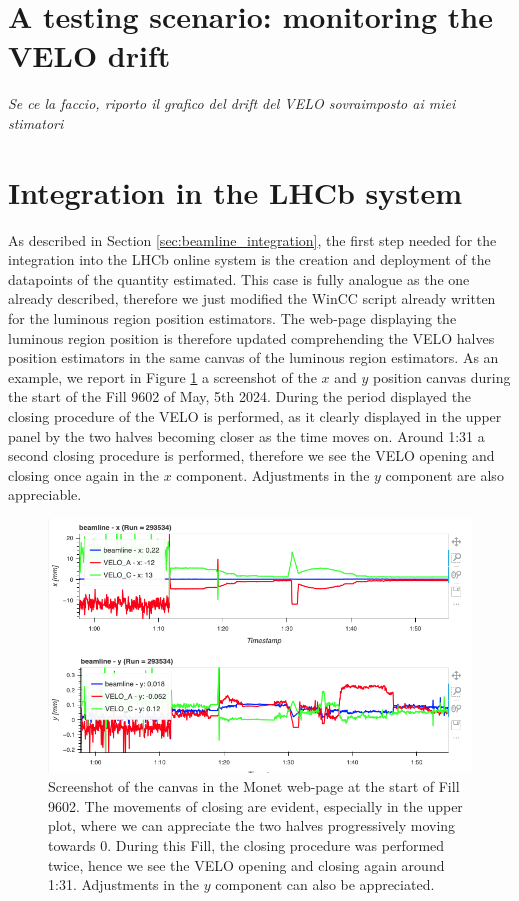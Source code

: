 \section{A testing scenario: monitoring the VELO drift}
\textit{Se ce la faccio, riporto il grafico del drift del VELO sovraimposto ai miei stimatori}

\section{Integration in the LHCb system}\label{sec:integration_detector}
As described in Section \ref{sec:beamline_integration}, the first step needed for the integration into the LHCb online system is the creation and deployment of the datapoints of the quantity estimated. This case is fully analogue as the one already described, therefore we just modified the WinCC script already written for the luminous region position estimators. The web-page displaying the luminous region position is therefore updated comprehending the VELO halves position estimators in the same canvas of the luminous region estimators. As an example, we report in Figure \ref{fig:VELO_closing_xy} a screenshot of the $x$ and $y$ position canvas during the start of the Fill 9602 of May, 5th 2024. During the period displayed the closing procedure of the VELO is performed, as it clearly displayed in the upper panel by the two halves becoming closer as the time moves on. Around 1:31 a second closing procedure is performed, therefore we see the VELO opening and closing once again in the $x$ component. Adjustments in the $y$ component are also appreciable.
\begin{figure}
    \centering
    \includegraphics[width=\textwidth]{figures/VELO_closing_xy.png}
    \caption{Screenshot of the canvas in the Monet web-page at the start of Fill 9602. The movements of closing are evident, especially in the upper plot, where we can appreciate the two halves progressively moving towards 0. During this Fill, the closing procedure was performed twice, hence we see the VELO opening and closing again around 1:31. Adjustments in the $y$ component can also be appreciated.} 
    \label{fig:VELO_closing_xy}
\end{figure}

